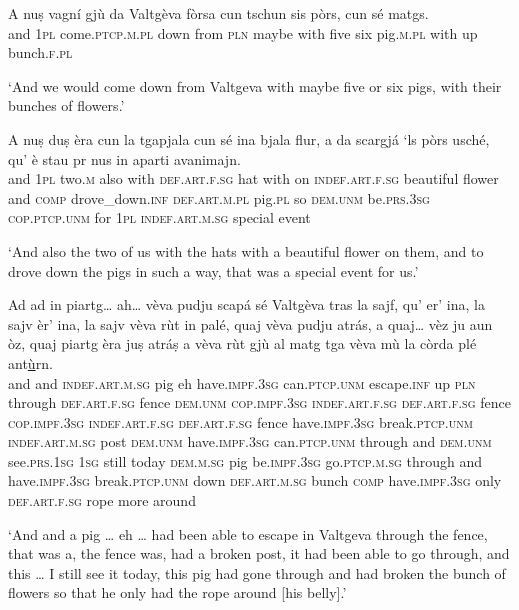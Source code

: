 \begin{linenumbers}
	\gll   A nuṣ vagní gjù da Valtgèva fòrsa cun tschun sis pòrs, cun sé matgs. \\
	and \textsc{1pl}  come.\textsc{ptcp.m.pl} down from  \textsc{pln} maybe with five six  pig.\textsc{m.pl} with up bunch.\textsc{f.pl}\\
\end{linenumbers}
\medskip
\glt `And we would come down from Valtgeva with maybe five or six pigs, with their bunches of flowers.'
\medskip

\begin{linenumbers}
	\gll    A nuṣ duṣ èra cun la tgapjala cun sé ina bjala flur, a da scargjá\footnotemark{} `ls pòrs usché, qu’ è stau pr nus in aparti avanimajn.\\
	and \textsc{1pl} two.\textsc{m} also with \textsc{def.art.f.sg} hat with on \textsc{indef.art.f.sg} beautiful flower and  \textsc{comp} drove\_down.\textsc{inf}  \textsc{def.art.m.pl} pig.\textsc{pl} so \textsc{dem.unm} be.\textsc{prs.3sg} \textsc{cop.ptcp.unm} for \textsc{1pl} \textsc{indef.art.m.sg} special event\\
\end{linenumbers}
\medskip
\glt `And also the two of us with the hats with a beautiful flower on them, and to drove down the pigs in such a way, that was a special event for us.'
\medskip

\begin{linenumbers}
	\gll    Ad ad in piartg… ah… vèva pudju scapá sé Valtgèva tras la sajf, qu’ er’ ina, la sajv èr' ina, la sajv vèva rùt in palé, quaj vèva pudju atrás, a quaj… vèz ju aun òz, quaj piartg èra juṣ atráṣ a vèva rùt gjù al matg tga vèva mù la còrda plé ant\underline{ù}rn.\\
	and and \textsc{indef.art.m.sg} pig eh  have.\textsc{impf.3sg} can.\textsc{ptcp.unm} escape.\textsc{inf} up \textsc{pln} through \textsc{def.art.f.sg} fence \textsc{dem.unm} \textsc{cop.impf.3sg} \textsc{indef.art.f.sg} \textsc{def.art.f.sg} fence \textsc{cop.impf.3sg} \textsc{indef.art.f.sg} \textsc{def.art.f.sg} fence  have.\textsc{impf.3sg} break.\textsc{ptcp.unm}  \textsc{indef.art.m.sg} post \textsc{dem.unm}  have.\textsc{impf.3sg} can.\textsc{ptcp.unm} through and  \textsc{dem.unm}  see.\textsc{prs.1sg} \textsc{1sg} still today \textsc{dem.m.sg} pig be.\textsc{impf.3sg} go.\textsc{ptcp.m.sg} through and have.\textsc{impf.3sg} break.\textsc{ptcp.unm} down \textsc{def.art.m.sg} bunch  \textsc{comp} have.\textsc{impf.3sg} only \textsc{def.art.f.sg} rope more around\\
\end{linenumbers}
\medskip
\glt `And and a pig … eh … had been able to escape in Valtgeva through the fence, that was a, the fence was, had a broken post, it had been able to go through, and this … I still see it today, this pig had gone through and had broken the bunch of flowers so that he only had the rope around [his belly].'
\medskip

